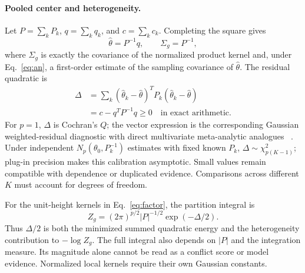 \paragraph{Pooled center and heterogeneity.}
Let $P=\sum_kP_k$, $q=\sum_kq_k$, and $c=\sum_kc_k$. Completing the square gives
\begin{equation}
\hat\theta=P^{-1}q,\qquad \Sigma_g=P^{-1},
\label{eq:pool}
\end{equation}
where $\Sigma_g$ is exactly the covariance of the normalized product kernel and, under
Eq.~\eqref{eq:an}, a first-order estimate of the sampling covariance of $\hat\theta$. The
residual quadratic is
\begin{equation}
\begin{aligned}
\Delta
&=\sum_k(\hat\theta_k-\hat\theta)^TP_k
       (\hat\theta_k-\hat\theta)\\
&=c-q^TP^{-1}q\ge0
\quad\text{in exact arithmetic}.
\end{aligned}
\label{eq:heterogeneity}
\end{equation}
For $p=1$, $\Delta$ is Cochran's $Q$; the vector expression is the corresponding Gaussian
weighted-residual diagnostic with direct multivariate meta-analytic analogues
~\cite{cochran1954combination,jackson2012heterogeneity}. Under independent
$N_p(\theta_0,P_k^{-1})$ estimates with fixed known $P_k$,
$\Delta\sim\chi^2_{p(K-1)}$; plug-in precision makes this calibration asymptotic. Small values
remain compatible with dependence or duplicated evidence. Comparisons across different $K$
must account for degrees of freedom.

For the unit-height kernels in Eq.~\eqref{eq:factor}, the partition integral is
\begin{equation}
Z_g=(2\pi)^{p/2}|P|^{-1/2}\exp(-\Delta/2).
\label{eq:normalizer}
\end{equation}
Thus $\Delta/2$ is both the minimized summed quadratic energy and the heterogeneity contribution
to $-\log Z_g$. The full integral also depends on $|P|$ and the integration measure. Its
magnitude alone cannot be read as a conflict score or model evidence. Normalized local kernels
require their own Gaussian constants.

